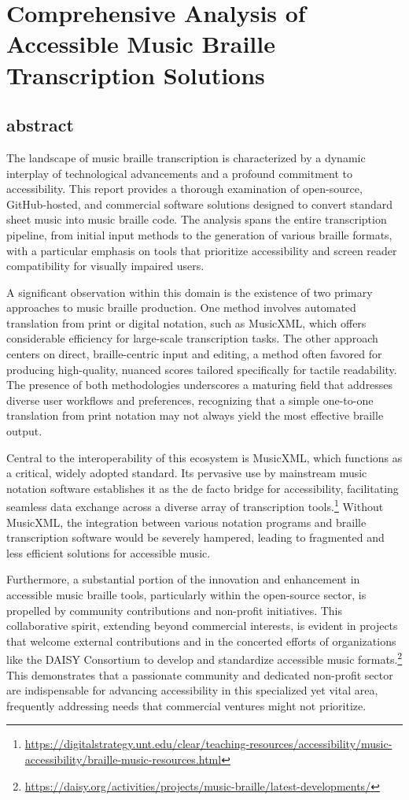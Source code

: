 \chapter{Comprehensive Analysis of Accessible Music Braille Transcription Solutions}

\section{abstract}
The landscape of music braille transcription is characterized by a dynamic interplay of technological advancements and a profound commitment to accessibility. This report provides a thorough examination of open-source, GitHub-hosted, and commercial software solutions designed to convert standard sheet music into music braille code. The analysis spans the entire transcription pipeline, from initial input methods to the generation of various braille formats, with a particular emphasis on tools that prioritize accessibility and screen reader compatibility for visually impaired users.

A significant observation within this domain is the existence of two primary approaches to music braille production. One method involves automated translation from print or digital notation, such as MusicXML, which offers considerable efficiency for large-scale transcription tasks. The other approach centers on direct, braille-centric input and editing, a method often favored for producing high-quality, nuanced scores tailored specifically for tactile readability. The presence of both methodologies underscores a maturing field that addresses diverse user workflows and preferences, recognizing that a simple one-to-one translation from print notation may not always yield the most effective braille output.

Central to the interoperability of this ecosystem is MusicXML, which functions as a critical, widely adopted standard. Its pervasive use by mainstream music notation software establishes it as the de facto bridge for accessibility, facilitating seamless data exchange across a diverse array of transcription tools.\footnote{\url{https://digitalstrategy.unt.edu/clear/teaching-resources/accessibility/music-accessibility/braille-music-resources.html}} Without MusicXML, the integration between various notation programs and braille transcription software would be severely hampered, leading to fragmented and less efficient solutions for accessible music.

Furthermore, a substantial portion of the innovation and enhancement in accessible music braille tools, particularly within the open-source sector, is propelled by community contributions and non-profit initiatives. This collaborative spirit, extending beyond commercial interests, is evident in projects that welcome external contributions and in the concerted efforts of organizations like the DAISY Consortium to develop and standardize accessible music formats.\footnote{\url{https://daisy.org/activities/projects/music-braille/latest-developments/}} This demonstrates that a passionate community and dedicated non-profit sector are indispensable for advancing accessibility in this specialized yet vital area, frequently addressing needs that commercial ventures might not prioritize.



